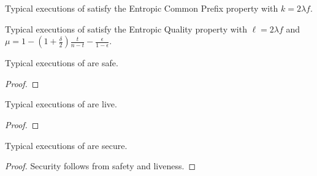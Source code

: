 \begin{theorem} 
  Typical executions of \poem satisfy the Entropic Common Prefix property
  with $k = 2 \lambda f$.
\end{theorem}

\begin{theorem} 
  Typical executions of \poem satisfy the Entropic Quality property
  with $\ell = 2 \lambda f$ and
  $\mu = 1 - (1 + \frac{\delta}{2})\frac{t}{n - t} - \frac{\epsilon}{1 - \epsilon}$.
\end{theorem}

\begin{conjecture}
  Typical executions of \poem are safe.
\end{conjecture}
\begin{proof}
\end{proof}

\begin{conjecture}
  Typical executions of \poem are live.
\end{conjecture}
\begin{proof}
\end{proof}

\begin{corollary}
  Typical executions of \poem are secure.
\end{corollary}
\begin{proof}
  Security follows from safety and liveness.
  \Qed
\end{proof}
